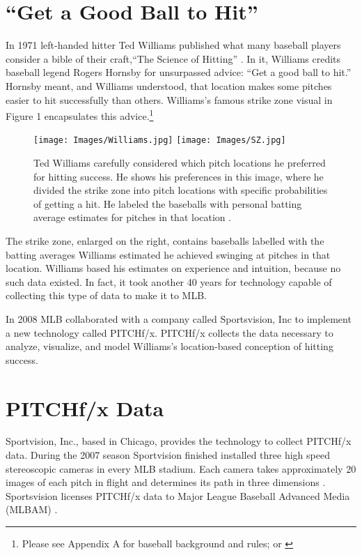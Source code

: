 \section{``Get a Good Ball to Hit''}
In 1971 left-handed hitter Ted Williams published what many baseball players consider a bible of their craft,``The Science of Hitting'' \citep{Williams1971}. In it, Williams credits baseball legend Rogers Hornsby for unsurpassed advice: ``Get a good ball to hit.'' Hornsby meant, and Williams understood, that location makes some pitches easier to hit successfully than others. Williams's famous strike zone visual in Figure 1 encapsulates this advice.\footnote{Please see Appendix A for baseball background and rules; or \citep{Wiki}}
        \begin{figure}[H]
      	\centering
      	\texttt{[image: Images/Williams.jpg]} 
      	\texttt{[image: Images/SZ.jpg]}
      	\caption{Ted Williams carefully considered which pitch locations he preferred for hitting success. He shows his preferences in this image, where he divided the strike zone into pitch locations with specific probabilities of getting a hit. He labeled the baseballs with personal batting average estimates for pitches in that location \citep{Williams1971}.}
      	\end{figure} 
The strike zone, enlarged on the right, contains baseballs labelled with the batting averages Williams estimated he achieved swinging at pitches in that location. Williams based his estimates on experience and intuition, because no such data existed. In fact, it took another 40 years for technology capable of collecting this type of data to make it to MLB\textsuperscript{\textregistered}.

In 2008 MLB collaborated with a company called Sportsvision, Inc to implement a new technology called PITCHf/x\textsuperscript{\textregistered}. PITCHf/x\textsuperscript{\textregistered} collects the data necessary to analyze, visualize, and model Williams's location-based conception of hitting success.

\section{PITCHf/x\textsuperscript{\textregistered} Data} %
Sportvision, Inc., based in Chicago, provides the technology to collect PITCHf/x\textsuperscript{\textregistered} data. During the 2007 season Sportvision finished installed three high speed stereoscopic cameras in every MLB\textsuperscript{\textregistered} stadium. Each camera takes approximately 20 images of each pitch in flight and determines its path in three dimensions \citep{Fast2010}. Sportsvision licenses PITCHf/x\textsuperscript{\textregistered} data to Major League Baseball Advanced Media (MLBAM\textsuperscript{\textregistered}) \citep{Baumer2010}. 

